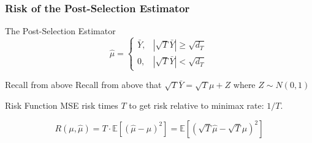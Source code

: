 \begin{frame}
  \frametitle{Risk of the Post-Selection Estimator}
  \begin{block}{The Post-Selection Estimator}
	$$\widehat{\mu}=\left\{\begin{array}
		{cc} \bar{Y}, & |\sqrt{T}\bar{Y} | \geq \sqrt{d_T} \\
		0, & |\sqrt{T}\bar{Y} | < \sqrt{d_T}
		\end{array}\right.$$
  \end{block}

  \pause

  \vspace{-2em}

  \begin{block}{Recall from above}
Recall from above that $\sqrt{T} \bar{Y} = \sqrt{T}\mu +Z$ where $Z\sim N(0,1)$
  \end{block}

  \pause

  \begin{block}{Risk Function}
MSE risk times $T$ to get risk relative to minimax rate: $1/T$.

\[
  R(\mu, \widehat{\mu}) = T \cdot \mathbb{E}\left[\left( \widehat{\mu} - \mu\right)^2\right] = \mathbb{E}\left[\left(\sqrt{T} \widehat{\mu} - \sqrt{T} \mu\right)^2\right] 
\]
  \end{block}
\end{frame}
%
%
